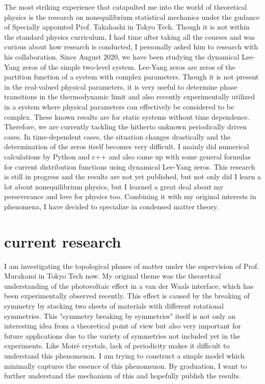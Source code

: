 \documentclass[a4]{article}
\begin{document}
The most striking experience that catapulted me into the world of theoretical physics is the research on nonequilibrium statistical mechanics under the gudance of Specially appointed Prof. Takahashi in Tokyo Tech. Though it is not within the standard physics curriculum, I had time after taking all the courses and was curious about how research is conducted, I personally asked him to research with his collaboration. Since August 2020, we have been studying the dynamical Lee-Yang zeros of the simple two-level system. Lee-Yang zeros are zeros of the partition function of a system with complex parameters. Though it is not present in the real-valued physical parameters, it is very useful to determine phase transitions in the thermodynamic limit and also recently experimentally utilized in a system where physical parameters can effectively be considered to be complex. These known results are for static systems without time dependence. Therefore, we are currently tackling the hitherto unknown periodically driven cases. In time-dependent cases, the situation changes drastically and the determination of the zeros itself becomes very difficult. I mainly did numerical calculations by Python and c++ and also came up with some general formulas for current distribution functions using dynamical Lee-Yang zeros. This research is still in progress and the results are not yet published, but not only did I learn a lot about nonequilibrium physics, but I learned a great deal about my perseverance and love for physics too. Combining it with my original interests in phenomena, I have decided to specialize in condensed matter theory.\par

\section{current research}
I am investigating the topological phases of matter under the supervision of Prof. Murakami in Tokyo Tech now. My original theme was the theoretical understanding of the photovoltaic effect in a van der Waals interface, which has been experimentally observed recently. This effect is caused by the breaking of symmetry by stacking two sheets of materials with different rotational symmetries. This "symmetry breaking by symmetries" itself is not only an interesting idea from a theoretical point of view but also very important for future applications due to the variety of symmetries not included yet in the experiments. Like Moir\'{e} crystals, lack of periodicity makes it difficult to understand this phenomenon. I am trying to construct a simple model which minimally captures the essence of this phenomenon. By graduation, I want to further understand the mechanism of this and hopefully publish the results. \par
\end{document}
